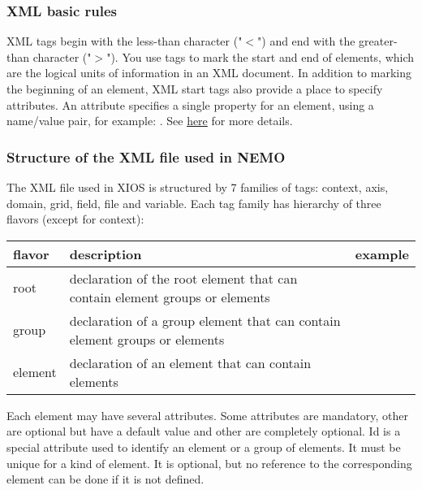 \documentclass[../tex_main/NEMO_manual]{subfiles}
\begin{document}
\subsubsection{ XML basic rules}

XML tags begin with the less-than character ("$<$") and end with the greater-than character ("$>$").
You use tags to mark the start and end of elements, which are the logical units of information in an XML document.
In addition to marking the beginning of an element, XML start tags also provide a place to specify attributes.
An attribute specifies a single property for an element, using a name/value pair, for example:
.
See \href{http://www.xmlnews.org/docs/xml-basics.html}{here} for more details.

\subsubsection{Structure of the XML file used in NEMO}

The XML file used in XIOS is structured by 7 families of tags:
context, axis, domain, grid, field, file and variable.
Each tag family has hierarchy of three flavors (except for context):

\begin{table} \scriptsize
	\begin{tabular*}{\textwidth}{|p{}p{}p{}|} \hline
		flavor  & description                                                                 &
		example                          \\ \hline \hline
		root    & declaration of the root element that can contain element groups or elements &
		\xmlcode{<file_definition ... >} \\ \hline
		group   & declaration of a group element that can contain element groups or elements  &
		\xmlcode{<file_group      ... >} \\ \hline
		element & declaration of an element that can contain elements                         &
		\xmlcode{<file            ... >} \\ \hline
	\end{tabular*}
\end{table}

Each element may have several attributes.
Some attributes are mandatory, other are optional but have a default value and other are completely optional.
Id is a special attribute used to identify an element or a group of elements.
It must be unique for a kind of element.
It is optional, but no reference to the corresponding element can be done if it is not defined.
\end{document}
